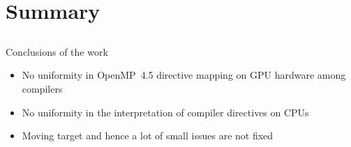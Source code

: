 \documentclass[xcolor=dvipsnames,compress,10pt]{nersc}
\begin{document}
%

\section{Summary}
\subsection{}
\begin{frame}[fragile]{Conclusions of the work}
\begin{itemize}
    \setlength\itemsep{1.2em}
    \item No uniformity in OpenMP~4.5 directive mapping on GPU hardware among compilers
    \item No uniformity in the interpretation of compiler directives on CPUs
    \item Moving target and hence a lot of small issues are not fixed
\end{itemize}
\end{frame}

\end{document}
